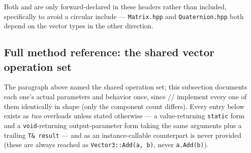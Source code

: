 Both  and  are only forward-declared in these headers
rather than included, specifically to avoid a circular include --- \texttt{Matrix.hpp} and
\texttt{Quaternion.hpp} both depend on the vector types in the other direction.

\subsection{Full method reference: the shared vector operation set}
\label{sec:vector-full-reference}

The paragraph above named the shared operation set; this subsection documents each one's
actual parameters and behavior once, since //%
 implement every one of them identically in shape (only the component count
differs). Every entry below exists as \emph{two} overloads unless stated otherwise --- a
value-returning \texttt{static} form and a \texttt{void}-returning output-parameter form taking
the same arguments plus a trailing \texttt{T\& result} --- and as an instance-callable
counterpart is never provided (these are always reached as \texttt{Vector3::Add(a, b)}, never
\texttt{a.Add(b)}).

